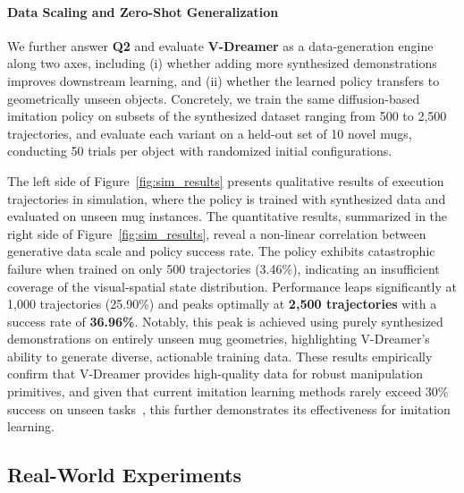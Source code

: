 \paragraph{Data Scaling and Zero-Shot Generalization}
We further answer \textbf{Q2} and evaluate \textbf{V-Dreamer} as a data-generation engine along two axes, including (i) whether adding more synthesized demonstrations improves downstream learning, and (ii) whether the learned policy transfers to geometrically unseen objects. Concretely, we train the same diffusion-based imitation policy on subsets of the synthesized dataset ranging from 500 to 2,500 trajectories, and evaluate each variant on a held-out set of 10 novel mugs, conducting 50 trials per object with randomized initial configurations.

The left side of Figure~\ref{fig:sim_results} presents qualitative results of execution trajectories in simulation, where the policy is trained with synthesized data and evaluated on unseen mug instances. The quantitative results, summarized in the right side of Figure~\ref{fig:sim_results}, reveal a non-linear correlation between generative data scale and policy success rate. The policy exhibits catastrophic failure when trained on only 500 trajectories (3.46\%), indicating an insufficient coverage of the visual-spatial state distribution. Performance leaps significantly at 1,000 trajectories (25.90\%) and peaks optimally at \textbf{2,500 trajectories} with a success rate of \textbf{36.96\%}. 
Notably, this peak is achieved using purely synthesized demonstrations on entirely unseen mug geometries, highlighting V-Dreamer’s ability to generate diverse, actionable training data. These results empirically confirm that V-Dreamer provides high-quality data for robust manipulation primitives, and given that current imitation learning methods rarely exceed 30\% success on unseen tasks~\cite{chen2025robohiman}, this further demonstrates its effectiveness for imitation learning.



\subsection{Real-World Experiments}


